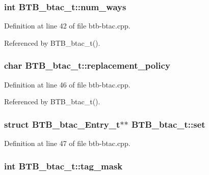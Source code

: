\subsubsection[{num\_\-ways}]{\setlength{\rightskip}{0pt plus 5cm}int {\bf BTB\_\-btac\_\-t::num\_\-ways}\hspace{0.3cm}{\tt  [protected]}}\label{classBTB__btac__t_0f4fff09dba86636a5ac899279f195c3}




Definition at line 42 of file btb-btac.cpp.

Referenced by BTB\_\-btac\_\-t().
\subsubsection[{replacement\_\-policy}]{\setlength{\rightskip}{0pt plus 5cm}char {\bf BTB\_\-btac\_\-t::replacement\_\-policy}\hspace{0.3cm}{\tt  [protected]}}\label{classBTB__btac__t_7027eff9e17bd92e31c5ed5fd14a5979}




Definition at line 46 of file btb-btac.cpp.

Referenced by BTB\_\-btac\_\-t().
\subsubsection[{set}]{\setlength{\rightskip}{0pt plus 5cm}struct {\bf BTB\_\-btac\_\-Entry\_\-t}$\ast$$\ast$ {\bf BTB\_\-btac\_\-t::set}\hspace{0.3cm}{\tt  [read, protected]}}\label{classBTB__btac__t_12d11e918708dc364866fef068d1679b}




Definition at line 47 of file btb-btac.cpp.
\subsubsection[{tag\_\-mask}]{\setlength{\rightskip}{0pt plus 5cm}int {\bf BTB\_\-btac\_\-t::tag\_\-mask}\hspace{0.3cm}{\tt  [protected]}}\label{classBTB__btac__t_d690e1d2bcb7b28373fdf5b067efb173}




